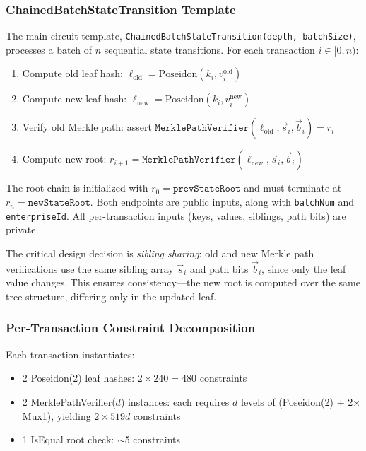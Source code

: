 \subsubsection{ChainedBatchStateTransition Template}

The main circuit template, \texttt{ChainedBatchStateTransition(depth,\allowbreak
batchSize)}, processes a batch of $n$ sequential state transitions.
For each transaction $i \in [0, n)$:

\begin{enumerate}
\item Compute old leaf hash: $\ell_{\text{old}} = \text{Poseidon}(k_i, v_i^{\text{old}})$
\item Compute new leaf hash: $\ell_{\text{new}} = \text{Poseidon}(k_i, v_i^{\text{new}})$
\item Verify old Merkle path: assert $\texttt{MerklePathVerifier}(\ell_{\text{old}}, \vec{s}_i, \vec{b}_i) = r_i$
\item Compute new root: $r_{i+1} = \texttt{MerklePathVerifier}(\ell_{\text{new}}, \vec{s}_i, \vec{b}_i)$
\end{enumerate}

The root chain is initialized with $r_0 = \texttt{prevStateRoot}$ and
must terminate at $r_n = \texttt{newStateRoot}$. Both endpoints are
public inputs, along with \texttt{batchNum} and \texttt{enterpriseId}.
All per-transaction inputs (keys, values, siblings, path bits) are
private.

The critical design decision is \emph{sibling sharing}: old and new
Merkle path verifications use the same sibling array $\vec{s}_i$
and path bits $\vec{b}_i$, since only the leaf value changes. This
ensures consistency---the new root is computed over the same tree
structure, differing only in the updated leaf.

\subsubsection{Per-Transaction Constraint Decomposition}

Each transaction instantiates:

\begin{itemize}
\item 2 Poseidon(2) leaf hashes: $2 \times 240 = 480$ constraints
\item 2 MerklePathVerifier($d$) instances: each requires $d$ levels of
  (Poseidon(2) + 2$\times$Mux1), yielding $2 \times 519d$ constraints
\item 1 IsEqual root check: $\sim$5 constraints
\end{itemize}

